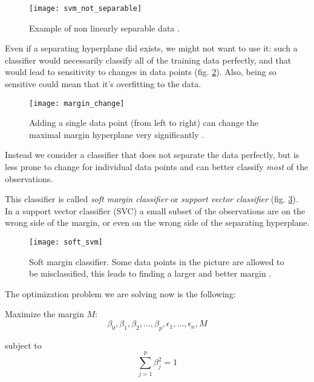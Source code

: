 \begin{figure}[H]
	\centering
	\texttt{[image: svm\_not\_separable]}
	\caption{Example of non linearly separable data \cite{svm_not_sep}.}
	\label{fig:svmnotsep}
\end{figure}

Even if a separating hyperplane did exists, we might not want to use it: such a classifier would necessarily  classify all of the training data perfectly, and that would lead to sensitivity to changes in data points (fig. \ref{fig:margin_change}). Also, being so sensitive could mean that it's overfitting to the data. 

\begin{figure}[H]
	\centering
	\texttt{[image: margin\_change]}
	\caption{Adding a single data point (from left to right) can change the maximal margin hyperplane very significantly \cite{ISLR}.}
	\label{fig:margin_change}
\end{figure}

Instead we consider a classifier that does not separate the data perfectly, but is less prone to change for individual data points and can better classify \textit{most} of the observations.

This classifier is called \textit{soft margin classifier} or \textit{support vector classifier} (fig. \ref{fig:soft_svm}). \\
In a support vector classifier (SVC) a small subset of the observations are on the wrong side of the margin, or even on the wrong side of the separating hyperplane.

\begin{figure}[H]
	\centering
	\texttt{[image: soft\_svm]}
	\caption{Soft margin classifier. Some data points in the picture are allowed to be misclassified, this leads to finding a larger and better margin \cite{soft_svm}.}
	\label{fig:soft_svm}
\end{figure}

The optimization problem we are solving now is the following: 

Maximize the margin $M$:
\begin{equation} \label{eq:svm4}
\beta_0, \beta_1, \beta_2, \dots, \beta_p, \epsilon_1, \dots, \epsilon_n, M
\end{equation}

subject to
\begin{equation} \label{eq:svm5}
\sum_{j=1}^{p}\beta^2_j = 1
\end{equation}

